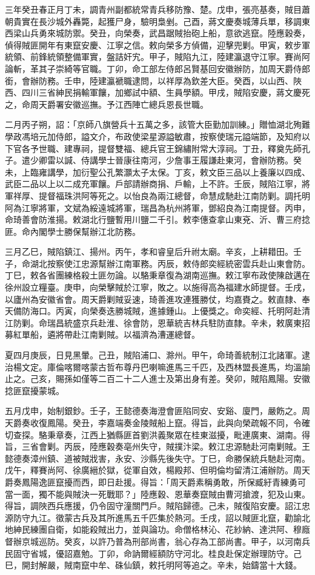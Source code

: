 \begin{pinyinscope}
三年癸丑春正月丁未，調青州副都統常青兵移防豫、楚。戊申，張亮基奏，賊目蕭朝貴實在長沙城外轟斃，起獲尸身，驗明梟剉。己酉，蔣文慶奏城薄兵單，移調東西梁山兵勇來城防禦。癸丑，向榮奏，武昌踞賊抬砲上船，意欲逃竄。陸應穀奏，偵得賊匪開年有東竄安慶、江寧之信。敕向榮多方偵備，迎擊兜剿。甲寅，敕步軍統領、前鋒統領整備軍實，盤詰奸宄。甲子，賊陷九江，陸建瀛退守江寧。賽尚阿論斬，革其子崇綺等官職。丁卯，命工部左侍郎呂賢基回安徽辦防，加周天爵侍郎銜，會辦防務。壬申，陸建瀛褫職逮問，以祥厚為欽差大臣。癸酉，以山西、陜西、四川三省紳民捐輸軍饟，加鄉試中額、生員學額。甲戌，賊陷安慶，蔣文慶死之，命周天爵署安徽巡撫。予江西陣亡總兵恩長世職。

二月丙子朔，詔：「京師八旗營兵十五萬之多，該管大臣勤加訓練。」贈恤湖北殉難學政馮培元加侍郎，謚文介，布政使梁星源謚敏肅，按察使瑞元謚端節，及知府以下官各予世職、建專祠，提督雙福、總兵官王錦繡附常大淳祠。丁丑，釋奠先師孔子。遣少卿雷以諴、侍講學士晉康往南河，少詹事王履謙赴東河，會辦防務。癸未，上臨雍講學，加衍聖公孔繁灝太子太保。丁亥，敕文臣三品以上養廉以四成、武臣二品以上以二成充軍饟。戶部請辦商捐、戶輸，上不許。壬辰，賊陷江寧，將軍祥厚、提督福珠洪阿等死之。以怡良為兩江總督，命慧成馳赴江南防剿。調托明阿為江寧將軍，文斌為綏遠城將軍，瑞昌為杭州將軍，鄧紹良為江南提督。丙申，命琦善會防淮揚。敕湖北行鹽暫用川鹽二千引。敕李僡查拿山東兗、沂、曹三府捻匪。命內閣學士勝保幫辦江北防務。

三月乙巳，賊陷鎮江、揚州。丙午，孝和睿皇后升祔太廟。辛亥，上耕耤田。壬子，命湖北按察使江忠源幫辦江南軍務。丙辰，敕侍郎奕經統密雲兵赴山東會防。丁巳，敕各省團練格殺土匪勿論。以駱秉章復為湖南巡撫。敕江寧布政使陳啟邁在徐州設立糧臺。庚申，向榮擊賊於江寧，敗之。以施得高為福建水師提督。壬戌，以廬州為安徽省會。周天爵剿賊妥速，琦善進攻連獲勝仗，均嘉賚之。敕直隸、奉天備防海口。丙寅，向榮奏迭勝城賊，進據鍾山。上優獎之。命奕經、托明阿赴清江防剿。命瑞昌統盛京兵赴淮、徐會防，恩華統吉林兵駐防直隸。辛未，敕廣東招募紅單船，遴將帶赴江南剿賊。以福濟為漕運總督。

夏四月庚辰，日見黑暈。己丑，賊陷浦口、滁州。甲午，命琦善統制江北諸軍。逮治楊文定。庫倫喀爾喀蒙古哲布尊丹巴喇嘛進馬三千匹，及西林盟長進馬，均溫諭止之。己亥，賜孫如僅等二百二十二人進士及第出身有差。癸卯，賊陷鳳陽。安徽捻匪竄擾蒙城。

五月戊申，始制銀鈔。壬子，王懿德奏海澄會匪陷同安、安谿、廈門，嚴飭之。周天爵奏收復鳳陽。癸丑，李嘉端奏金陵賊船上竄。得旨，此與向榮疏報不同，令確切查探。駱秉章奏，江西上猶縣匪首劉洪義聚眾在桂東滋擾，毗連廣東、湖南。得旨，三省會剿。丙辰，陸應穀奏亳州失守，賊撲汴梁。敕江忠源馳赴河南剿賊。王懿德奏漳州鎮、道被賊戕害，永安、沙縣先後失守。丁巳，命勝保統兵馳赴河南。戊午，釋賽尚阿、徐廣縉於獄，從軍自效，楊殿邦、但明倫均留清江浦辦防。周天爵奏鳳陽逸匪竄擾而西，即日赴援。得旨：「周天爵素稱勇敢，所保臧紆青練勇可當一面，獨不能與賊決一死戰耶？」陸應穀、恩華奏竄賊由曹河搶渡，犯及山東。得旨，調陜西兵應援，仍令固守潼關門戶。賊陷歸德。己未，賊復陷安慶。詔江忠源防守九江。徵蒙古兵及其所進馬五千匹集於熱河。壬戌，詔以賊匪北竄，勸諭北地紳民練團自衛，如能殺賊出力，並與論功。命僧格林沁、花紗納、達洪阿、穆廕督辦京城巡防。癸亥，以許乃普為刑部尚書，翁心存為工部尚書。甲子，以河南兵民固守省城，優詔嘉勉。丁卯，命訥爾經額防守河北。桂良赴保定辦理防守。己巳，開封解嚴，賊南竄中牟、硃仙鎮，敕托明阿等追之。辛未，始鑄當十大錢。


\end{pinyinscope}

